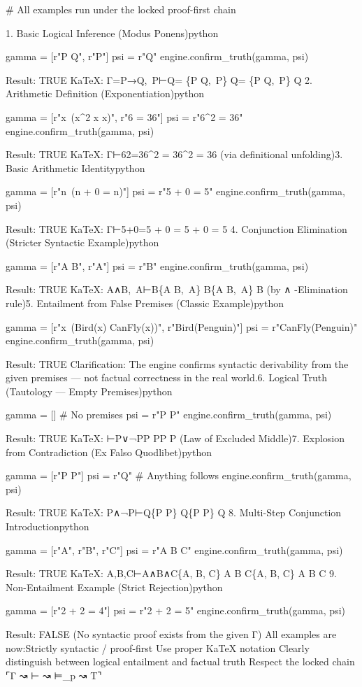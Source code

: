 # All examples run under the locked proof-first chain

1. Basic Logical Inference (Modus Ponens)python

gamma = [r"P \to Q", r"P"]
psi = r"Q"
engine.confirm_truth(gamma, psi)

Result: TRUE
KaTeX: Γ={P→Q, P}⊢Q\Gamma = \{P \to Q,\ P\} \vdash Q\Gamma = \{P \to Q,\ P\} \vdash Q
2. Arithmetic Definition (Exponentiation)python

gamma = [r"\forall x\ (x^2 \triangleq x \times x)", r"6  = 36"]
psi = r"6^2 = 36"
engine.confirm_truth(gamma, psi)

Result: TRUE
KaTeX: Γ⊢62=36\Gamma {}^2 = 36\Gamma {}^2 = 36
 (via definitional unfolding)3. Basic Arithmetic Identitypython

gamma = [r"\forall n\ (n + 0 = n)"]
psi = r"5 + 0 = 5"
engine.confirm_truth(gamma, psi)

Result: TRUE
KaTeX: Γ⊢5+0=5\Gamma {} + 0 = 5\Gamma {} + 0 = 5
4. Conjunction Elimination (Stricter Syntactic Example)python

gamma = [r"A \land B", r"A"]
psi = r"B"
engine.confirm_truth(gamma, psi)

Result: TRUE
KaTeX: {A∧B, A}⊢B\{A \land B,\ A\} \vdash B\{A \land B,\ A\} \vdash B
 (by ∧\land\land
-Elimination rule)5. Entailment from False Premises (Classic Example)python

gamma = [r"\forall x\ (Bird(x) \to CanFly(x))", r"Bird(Penguin)"]
psi = r"CanFly(Penguin)"
engine.confirm_truth(gamma, psi)

Result: TRUE
Clarification: The engine confirms syntactic derivability from the given premises — not factual correctness in the real world.6. Logical Truth (Tautology — Empty Premises)python

gamma = []  # No premises
psi = r"P \lor \neg P"
engine.confirm_truth(gamma, psi)

Result: TRUE
KaTeX: ⊢P∨¬P\vdash P \lor \neg P\vdash P \lor \neg P
 (Law of Excluded Middle)7. Explosion from Contradiction (Ex Falso Quodlibet)python

gamma = [r"P \land \neg P"]
psi = r"Q"   # Anything follows
engine.confirm_truth(gamma, psi)

Result: TRUE
KaTeX: {P∧¬P}⊢Q\{P \land \neg P\} \vdash Q\{P \land \neg P\} \vdash Q
8. Multi-Step Conjunction Introductionpython

gamma = [r"A", r"B", r"C"]
psi = r"A \land B \land C"
engine.confirm_truth(gamma, psi)

Result: TRUE
KaTeX: {A,B,C}⊢A∧B∧C\{A, B, C\} \vdash A \land B \land C\{A, B, C\} \vdash A \land B \land C
9. Non-Entailment Example (Strict Rejection)python

gamma = [r"2 + 2 = 4"]
psi = r"2 + 2 = 5"
engine.confirm_truth(gamma, psi)

Result: FALSE
(No syntactic proof exists from the given Γ)
All examples are now:Strictly syntactic / proof-first
Use proper KaTeX notation
Clearly distinguish between logical entailment and factual truth
Respect the locked chain ⌜Γ ↝ ⊢ ↝ ⊨_p ↝ T⌝
